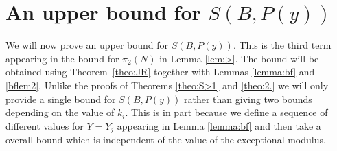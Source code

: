 \documentclass[12pt]{amsart}
\begin{document}
\section{An upper bound for $S(B,P(y))$}
\label{section:3}
We will now prove an upper bound for  $S(B,P(y))$. This is the third term appearing in the bound for $\pi_2(N)$ in Lemma \ref{lem:>}. The bound will be obtained using Theorem~\ref{theo:JR} together with Lemmas \ref{lemma:bf} and \ref{bflem2}. Unlike the proofs of Theorems \ref{theo:S>1} and \ref{theo:2.} we will only provide a single bound for $S(B,P(y))$ rather than giving two bounds depending on the value of $k_i$. This is in part because we define a sequence of different values for $Y=Y_j$ appearing in Lemma \ref{lemma:bf} and then take a overall bound which is independent of the value of the exceptional modulus.
\end{document}
